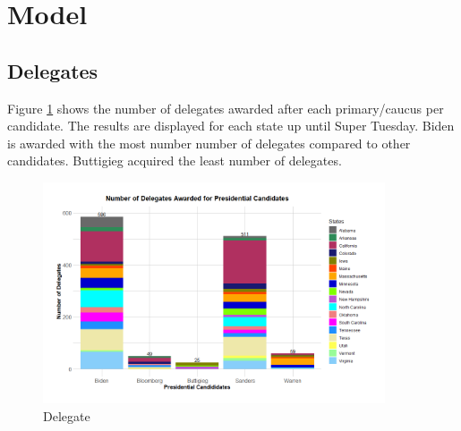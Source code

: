 
\section{Model}\label{model}
\subsection{Delegates}
Figure \ref{Delegate} shows the number of delegates awarded after each primary/caucus per candidate. The results are displayed for each state up until Super Tuesday. Biden is awarded with the most number number of delegates compared to other candidates. Buttigieg acquired the least number of delegates. 
\begin{figure}[H]
    \centering
    \includegraphics[width=0.9\textwidth]{figures/Delegate.png}
    \caption{Delegate}
    \label{Delegate}
\end{figure}

